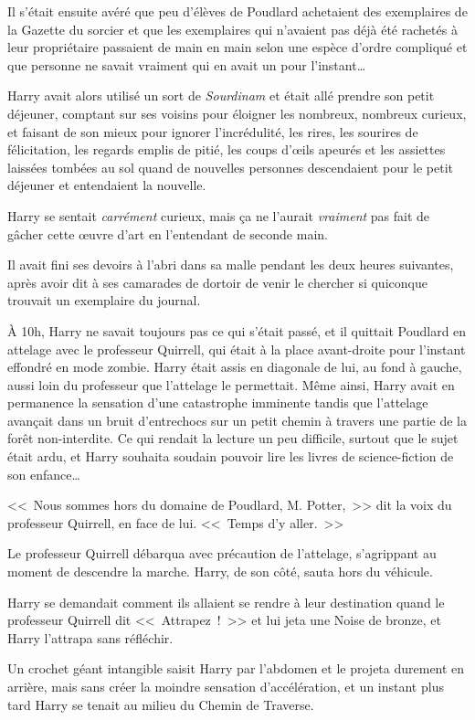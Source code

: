 Il s'était ensuite avéré que peu d'élèves de Poudlard achetaient des exemplaires de la Gazette du sorcier et que les exemplaires qui n'avaient pas déjà été rachetés à leur propriétaire passaient de main en main selon une espèce d'ordre compliqué et que personne ne savait vraiment qui en avait un pour l'instant…

Harry avait alors utilisé un sort de \emph{Sourdinam} et était allé prendre son petit déjeuner, comptant sur ses voisins pour éloigner les nombreux, nombreux curieux, et faisant de son mieux pour ignorer l'incrédulité, les rires, les sourires de félicitation, les regards emplis de pitié, les coups d'œils apeurés et les assiettes laissées tombées au sol quand de nouvelles personnes descendaient pour le petit déjeuner et entendaient la nouvelle.

Harry se sentait \emph{carrément} curieux, mais ça ne l'aurait \emph{vraiment} pas fait de gâcher cette œuvre d'art en l'entendant de seconde main.

Il avait fini ses devoirs à l'abri dans sa malle pendant les deux heures suivantes, après avoir dit à ses camarades de dortoir de venir le chercher si quiconque trouvait un exemplaire du journal.

À 10h, Harry ne savait toujours pas ce qui s'était passé, et il quittait Poudlard en attelage avec le professeur Quirrell, qui était à la place avant-droite pour l'instant effondré en mode zombie. Harry était assis en diagonale de lui, au fond à gauche, aussi loin du professeur que l'attelage le permettait. Même ainsi, Harry avait en permanence la sensation d'une catastrophe imminente tandis que l'attelage avançait dans un bruit d'entrechocs sur un petit chemin à travers une partie de la forêt non-interdite. Ce qui rendait la lecture un peu difficile, surtout que le sujet était ardu, et Harry souhaita soudain pouvoir lire les livres de science-fiction de son enfance…

<<~Nous sommes hors du domaine de Poudlard, M. Potter,~>> dit la voix du professeur Quirrell, en face de lui. <<~Temps d'y aller.~>>

Le professeur Quirrell débarqua avec précaution de l'attelage, s'agrippant au moment de descendre la marche. Harry, de son côté, sauta hors du véhicule.

Harry se demandait comment ils allaient se rendre à leur destination quand le professeur Quirrell dit <<~Attrapez~!~>> et lui jeta une Noise de bronze, et Harry l'attrapa sans réfléchir.

Un crochet géant intangible saisit Harry par l'abdomen et le projeta durement en arrière, mais sans créer la moindre sensation d'accélération, et un instant plus tard Harry se tenait au milieu du Chemin de Traverse.

